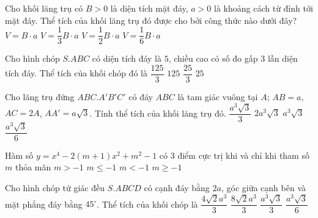 \begin{ex}%
Cho khối lăng trụ có $B>0$ là diện tích mặt đáy, $a>0$ là khoảng cách từ đỉnh tới mặt đáy. Thể tích của khối lăng trụ đó được cho bởi công thức nào dưới đây?
\choice
{\True $V=B\cdot a$}
{$V=\dfrac{1}{3}B\cdot a$}
{$V=\dfrac{1}{2}B\cdot a$}
{$V=\dfrac{1}{6}B\cdot a$}
\end{ex}

\begin{ex}%
Cho hình chóp $S.ABC$ có diện tích đáy là $5$, chiều cao có số đo gấp $3$ lần diện tích đáy. Thể tích của khối chóp đó là
\choice
{$\dfrac{125}{3}$}
{$125$}
{$\dfrac{25}{3}$}
{\True $25$}
\end{ex}

\begin{ex}%
Cho lăng trụ đứng $ABC.A'B'C'$ có đáy $ABC$ là tam giác vuông tại $A$; $AB=a$, $AC=2A$, $AA'=a\sqrt{3}$. Tính thể tích của khối lăng trụ đó.
\choice
{$\dfrac{a^3\sqrt{3}}{3}$}
{$2a^3\sqrt{3}$}
{\True $a^3\sqrt{3}$}
{$\dfrac{a^3\sqrt{3}}{6}$}
\end{ex}

\begin{ex}%
Hàm số $y=x^4-2(m+1)x^2+m^2-1$ có $3$ điểm cực trị khi và chỉ khi tham số $m$ thỏa mãn
\choice
{\True $m>-1$}
{$m\leq -1$}
{$m<-1$}
{$m\geq -1$}
\end{ex}

\begin{ex}%
Cho hình chóp tứ giác đều $S.ABCD$ có cạnh đáy bằng $2a$, góc giữa cạnh bên và mặt phẳng đáy bằng $45^{\circ}$. Thể tích của khối chóp là
\choice
{\True $\dfrac{4\sqrt{2}a^3}{3}$}
{$\dfrac{8\sqrt{2}a^3}{3}$}
{$\dfrac{a^3\sqrt{3}}{3}$}
{$\dfrac{a^3\sqrt{3}}{6}$}
\end{ex}

